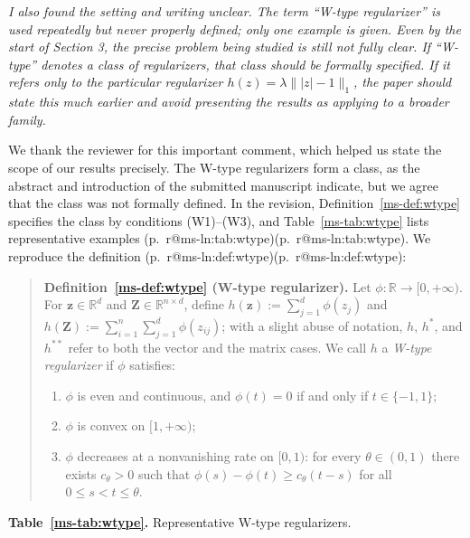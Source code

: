 \documentclass[11pt]{article}
\makeatletter
\newcommand{\mref}[1]{\ref*{ms-#1}}
\newcommand{\mpage}[1]{\pageref*{ms-#1}}
\newcommand{\mhasline}[1]{\ifcsname r@ms-ln:#1\endcsname\expandafter\@firstoftwo\else\expandafter\@secondoftwo\fi}
\newcommand{\mline}[1]{\getrefnumber{ms-ln:#1}}
\newcommand{\mpl}[1]{p.~\mpage{#1}\mhasline{#1}{, line~\mline{#1}}{}}
\newcommand{\RR}{\mathbb{R}}
\newcommand{\bz}{\bm{z}}
\newcommand{\bZ}{\bm{Z}}
\newcommand{\blue}[1]{{\ifmmode\color{blue}#1\else\normalfont\upshape\color{blue}#1\fi}}
\newenvironment{bluequote}{\begin{quote}\normalfont\upshape\color{blue}}{\end{quote}}
\newcommand{\newred}[1]{{\color{red}#1}}
\let\reviewitem\item
\newenvironment{qalist}{\begin{description}[leftmargin=0pt,labelindent=0pt,itemsep=0.8em,parsep=0.5em,font=\normalfont\upshape\bfseries]}{\end{description}}
\makeatother
\begin{document}
\begin{qalist}
\item[{Q2.}] {\itshape I also found the setting and writing unclear. The term ``W-type regularizer'' is used repeatedly but never properly defined; only one example is given. Even by the start of Section 3, the precise problem being studied is still not fully clear. If ``W-type'' denotes a class of regularizers, that class should be formally specified. If it refers only to the particular regularizer $h(z) = \lambda \lVert |z| - 1 \rVert_1$, the paper should state this much earlier and avoid presenting the results as applying to a broader family.}
\item[Response:]
We thank the reviewer for this important comment, which helped us state the scope of our results precisely. \newred{The W-type regularizers form a class,} as the abstract and introduction of the submitted manuscript indicate, but we agree that the class was not formally defined. In the revision, Definition~\mref{def:wtype} specifies the class by conditions (W1)--(W3), and Table~\mref{tab:wtype} lists representative examples \blue{(\mpl{tab:wtype})}. \newred{We reproduce} the definition \blue{(\mpl{def:wtype})}:
\begin{bluequote}
\textbf{Definition~\mref{def:wtype} (W-type regularizer).} Let $\phi:\RR\to[0,+\infty)$. For $\bz\in\RR^{d}$ and $\bZ\in\RR^{n\times d}$, define $h(\bz):=\sum_{j=1}^{d}\phi(z_j)$ and $h(\bZ):=\sum_{i=1}^{n}\sum_{j=1}^{d}\phi(z_{ij})$; with a slight abuse of notation, $h$, $h^*$, and $h^{**}$ refer to both the vector and the matrix cases. We call $h$ a \emph{W-type regularizer} if $\phi$ satisfies:
\begin{enumerate}[label=(W\arabic*),leftmargin=3em,before=\let\item\reviewitem]
\item $\phi$ is even and continuous, and $\phi(t)=0$ if and only if $t\in\{-1,1\}$;
\item $\phi$ is convex on $[1,+\infty)$;
\item $\phi$ decreases at a nonvanishing rate on $[0,1)$: for every $\theta\in(0,1)$ there exists $c_{\theta}>0$ such that $\phi(s)-\phi(t)\ge c_{\theta}(t-s)$ for all $0\le s<t\le\theta$.
\end{enumerate}
\end{bluequote}
\begin{center}\normalfont\upshape\color{blue}
\textbf{Table~\mref{tab:wtype}.} Representative W-type regularizers.\par\smallskip
\setlength{\tabcolsep}{4pt}
\renewcommand{\arraystretch}{1.4}

\end{center}
\end{qalist}
\end{document}
